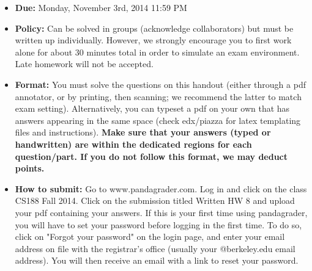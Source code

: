 \begin{itemize}
\item \textbf{Due:} Monday, November 3rd, 2014 11:59 PM
\item \textbf{Policy:} Can be solved in groups (acknowledge collaborators) but must
be written up individually. However, we strongly encourage you to first work alone for about 30 minutes total in order to simulate an exam environment.  Late homework will not be accepted.
\item \textbf{Format:}
You must solve the questions on this handout (either through a pdf annotator, or by printing, then scanning; we recommend the latter to match exam setting). Alternatively, you can typeset a pdf on your own that has answers appearing in the same space (check edx/piazza for latex templating files and instructions).
\textbf{Make sure that your answers (typed or handwritten) are within the
dedicated regions for each question/part.  If you do not follow this format, we may deduct points.}

\item \textbf{How to submit:}  Go to www.pandagrader.com. Log in and click on the
class CS188 Fall 2014. Click on the submission titled Written HW 8 and upload your pdf containing your answers. If this is your first time using pandagrader, you will have to set your password before logging in the first time.  To do so, click on "Forgot your password" on the login page, and enter your email address on file with the registrar's office (usually your @berkeley.edu email address). You will then receive an email with a link to reset your password.

\end{itemize}


